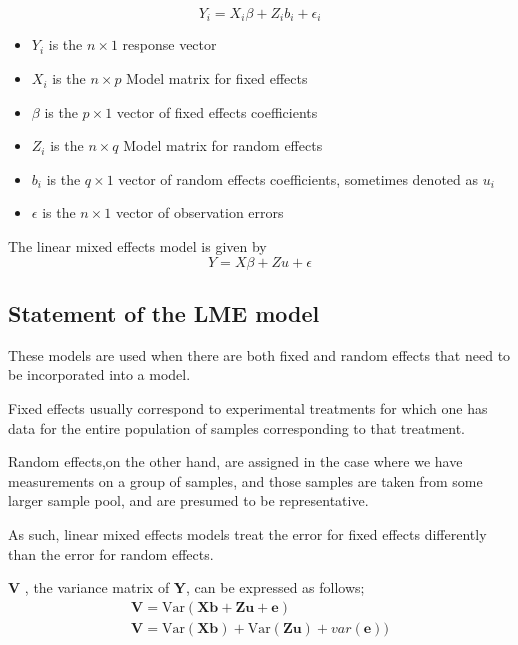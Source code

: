 \documentclass[12pt, a4paper]{report}
\theoremstyle{plain}
\theoremstyle{definition}
\theoremstyle{remark}
\begin{document}
\begin{displaymath}
Y_{i} =X_{i}\beta + Z_{i}b_{i} + \epsilon_{i}
\end{displaymath}
\begin{itemize}
	
	\item $Y_{i}$ is the $n \times 1$ response vector \item $X_{i}$ is
	the $n \times p$ Model matrix for fixed effects \item $\beta$ is
	the $p \times 1$ vector of fixed effects coefficients \item
	$Z_{i}$ is the $n \times q$ Model matrix for random effects \item
	$b_{i}$ is the $q \times 1$ vector of random effects coefficients,
	sometimes denoted as $u_{i}$ \item $\epsilon$ is the $n \times 1$
	vector of observation errors
\end{itemize}


The linear mixed effects model is given by
\begin{equation}
Y = X\beta + Zu + \epsilon
\end{equation}



\subsection{Statement of the LME model}


These models are used when there are both fixed and random effects that need to be incorporated into a model.

Fixed effects usually correspond to experimental treatments for which one has data for the entire population of samples corresponding to that treatment.

Random effects,on the other hand, are assigned in the case where we have measurements on a group of samples, and those
samples are taken from some larger sample pool, and are presumed to be representative.

As such, linear mixed effects models treat the error for fixed effects differently than the error for random effects.




\textbf{V} , the variance matrix of \textbf{Y}, can be expressed
as follows;
\begin{eqnarray}
\textbf{V}= \textrm{Var} ( \textbf{Xb} + \textbf{Zu} + \textbf{e})\\
\textbf{V}= \textrm{Var} ( \textbf{Xb} ) + \textrm{Var} (\textbf{Zu}) +
var(\textbf{e}))
\end{eqnarray}
\end{document}
